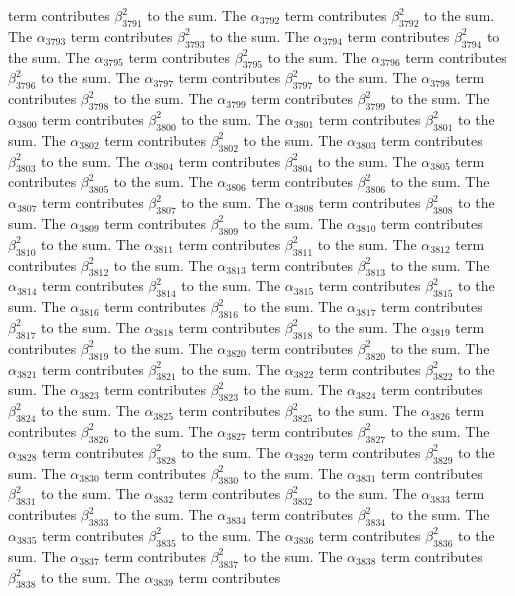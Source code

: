 \begin{lemma}
term contributes $\beta_{3791}^{2}$ to the sum. The $\alpha_{3792}$ term contributes $\beta_{3792}^{2}$ to the sum. The $\alpha_{3793}$ term contributes $\beta_{3793}^{2}$ to the sum. The $\alpha_{3794}$ term contributes $\beta_{3794}^{2}$ to the sum. The $\alpha_{3795}$ term contributes $\beta_{3795}^{2}$ to the sum. The $\alpha_{3796}$ term contributes $\beta_{3796}^{2}$ to the sum. The $\alpha_{3797}$ term contributes $\beta_{3797}^{2}$ to the sum. The $\alpha_{3798}$ term contributes $\beta_{3798}^{2}$ to the sum. The $\alpha_{3799}$ term contributes $\beta_{3799}^{2}$ to the sum. The $\alpha_{3800}$ term contributes $\beta_{3800}^{2}$ to the sum. The $\alpha_{3801}$ term contributes $\beta_{3801}^{2}$ to the sum. The $\alpha_{3802}$ term contributes $\beta_{3802}^{2}$ to the sum. The $\alpha_{3803}$ term contributes $\beta_{3803}^{2}$ to the sum. The $\alpha_{3804}$ term contributes $\beta_{3804}^{2}$ to the sum. The $\alpha_{3805}$ term contributes $\beta_{3805}^{2}$ to the sum. The $\alpha_{3806}$ term contributes $\beta_{3806}^{2}$ to the sum. The $\alpha_{3807}$ term contributes $\beta_{3807}^{2}$ to the sum. The $\alpha_{3808}$ term contributes $\beta_{3808}^{2}$ to the sum. The $\alpha_{3809}$ term contributes $\beta_{3809}^{2}$ to the sum. The $\alpha_{3810}$ term contributes $\beta_{3810}^{2}$ to the sum. The $\alpha_{3811}$ term contributes $\beta_{3811}^{2}$ to the sum. The $\alpha_{3812}$ term contributes $\beta_{3812}^{2}$ to the sum. The $\alpha_{3813}$ term contributes $\beta_{3813}^{2}$ to the sum. The $\alpha_{3814}$ term contributes $\beta_{3814}^{2}$ to the sum. The $\alpha_{3815}$ term contributes $\beta_{3815}^{2}$ to the sum. The $\alpha_{3816}$ term contributes $\beta_{3816}^{2}$ to the sum. The $\alpha_{3817}$ term contributes $\beta_{3817}^{2}$ to the sum. The $\alpha_{3818}$ term contributes $\beta_{3818}^{2}$ to the sum. The $\alpha_{3819}$ term contributes $\beta_{3819}^{2}$ to the sum. The $\alpha_{3820}$ term contributes $\beta_{3820}^{2}$ to the sum. The $\alpha_{3821}$ term contributes $\beta_{3821}^{2}$ to the sum. The $\alpha_{3822}$ term contributes $\beta_{3822}^{2}$ to the sum. The $\alpha_{3823}$ term contributes $\beta_{3823}^{2}$ to the sum. The $\alpha_{3824}$ term contributes $\beta_{3824}^{2}$ to the sum. The $\alpha_{3825}$ term contributes $\beta_{3825}^{2}$ to the sum. The $\alpha_{3826}$ term contributes $\beta_{3826}^{2}$ to the sum. The $\alpha_{3827}$ term contributes $\beta_{3827}^{2}$ to the sum. The $\alpha_{3828}$ term contributes $\beta_{3828}^{2}$ to the sum. The $\alpha_{3829}$ term contributes $\beta_{3829}^{2}$ to the sum. The $\alpha_{3830}$ term contributes $\beta_{3830}^{2}$ to the sum. The $\alpha_{3831}$ term contributes $\beta_{3831}^{2}$ to the sum. The $\alpha_{3832}$ term contributes $\beta_{3832}^{2}$ to the sum. The $\alpha_{3833}$ term contributes $\beta_{3833}^{2}$ to the sum. The $\alpha_{3834}$ term contributes $\beta_{3834}^{2}$ to the sum. The $\alpha_{3835}$ term contributes $\beta_{3835}^{2}$ to the sum. The $\alpha_{3836}$ term contributes $\beta_{3836}^{2}$ to the sum. The $\alpha_{3837}$ term contributes $\beta_{3837}^{2}$ to the sum. The $\alpha_{3838}$ term contributes $\beta_{3838}^{2}$ to the sum. The $\alpha_{3839}$ term contributes 
\end{lemma}
